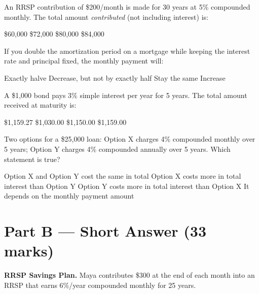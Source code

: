 \documentclass[addpoints]{exam}
\begin{document}
\begin{questions}
\question[1]
An RRSP contribution of \$200/month is made for 30 years at 5\% compounded monthly. The total amount \textit{contributed} (not including interest) is:
\begin{choices}
    \choice \$60{,}000
    \correctchoice \$72{,}000
    \choice \$80{,}000
    \choice \$84{,}000
\end{choices}
\vspace{3mm}

\question[1]
If you double the amortization period on a mortgage while keeping the interest rate and principal fixed, the monthly payment will:
\begin{choices}
    \choice Exactly halve
    \correctchoice Decrease, but not by exactly half
    \choice Stay the same
    \choice Increase
\end{choices}
\vspace{3mm}

\question[1]
A \$1{,}000 bond pays 3\% simple interest per year for 5 years. The total amount received at maturity is:
\begin{choices}
    \choice \$1{,}159.27
    \choice \$1{,}030.00
    \correctchoice \$1{,}150.00
    \choice \$1{,}159.00
\end{choices}
\vspace{3mm}

\question[1]
Two options for a \$25{,}000 loan: Option X charges 4\% compounded monthly over 5 years; Option Y charges 4\% compounded annually over 5 years. Which statement is true?
\begin{choices}
    \choice Option X and Option Y cost the same in total
    \correctchoice Option X costs more in total interest than Option Y
    \choice Option Y costs more in total interest than Option X
    \choice It depends on the monthly payment amount
\end{choices}
\vspace{3mm}

\section*{Part B --- Short Answer (33 marks)}

\vspace{5mm}

\question[6]
\textbf{RRSP Savings Plan.}
Maya contributes \$300 at the end of each month into an RRSP that earns 6\%/year compounded monthly for 25 years.

\begin{parts}

\end{parts}
\end{questions}
\end{document}

